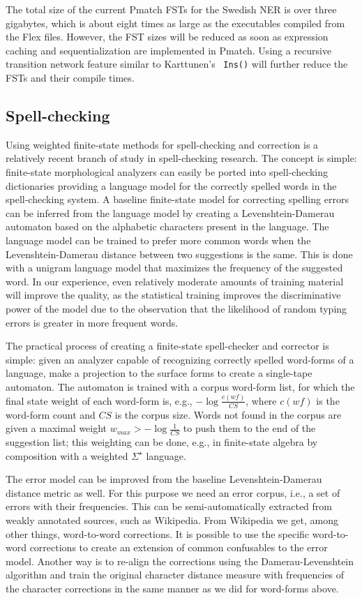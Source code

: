\documentclass{llncs}
\begin{document}
The total size of the current Pmatch
FSTs for the Swedish NER is over three gigabytes, which is about eight times as large as the
executables compiled from the Flex files. However, the FST sizes
will be reduced as soon as expression caching and sequentialization
are implemented in Pmatch. Using a recursive transition network
feature similar to Karttunen's~\cite{karttunen/2011} \texttt{Ins()}
will further reduce the FSTs and their compile times.

\subsection{Spell-checking}
Using weighted finite-state methods for spell-checking and correction 
is a relatively recent branch of study in spell-checking research. The concept
is simple: finite-state morphological analyzers can easily be ported
into spell-checking dictionaries providing a language model for the correctly
spelled words in the spell-checking system. A baseline finite-state model for
correcting spelling errors can be inferred from the language model by creating
a Levenshtein-Damerau automaton based on the alphabetic characters present in
the language. The language model can be trained to prefer more common
words when the Levenshtein-Damerau distance between two suggestions is the same.
This is done with a unigram language model that maximizes
the frequency of the suggested word. In our experience, even relatively moderate
amounts of training material will improve the quality, as the statistical training
improves the discriminative power of the model due to the observation that the likelihood of random
typing errors is greater in more frequent words.

The practical process of creating a finite-state spell-checker and corrector
is simple: given an analyzer capable of recognizing correctly spelled
word-forms of a language, make a projection to the surface forms to create a
single-tape automaton. The automaton is trained with a corpus word-form list, 
for which the final state weight of each word-form is, e.g., $-\log\frac{c(wf)}{CS}$, where 
$c(wf)$ is the word-form count and $CS$ is the corpus size. Words not
found in the corpus are given a maximal weight $w_{max} > -\log\frac{1}{CS}$ to
push them to the end of the suggestion list; this weighting can be done, e.g.,
in finite-state algebra by composition with a weighted $\Sigma^{\star}$ language.

The error model can be improved from the baseline Levenshtein-Damerau distance
metric as well. For this purpose we need an error corpus, i.e., a set of
errors with their frequencies. This can be semi-automatically extracted from
weakly annotated sources, such as Wikipedia. From Wikipedia we get, among 
other things, word-to-word corrections. It is possible to use the specific
word-to-word corrections to create an extension of common confusables to the
error model. Another way is to re-align the corrections using the
Damerau-Levenshtein algorithm and train the original character distance measure with
frequencies of the character corrections in the same manner as we did for word-forms above.
\end{document}
